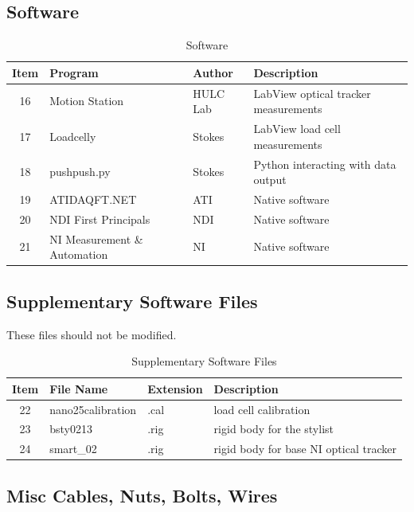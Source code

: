\documentclass[pdftex,11pt,letterpaper]{article}
\begin{document}
\subsection{Software}

\begin{table}[h!]
\begin{center}
    \begin{tabular}{ | c | l | l | l |}
    \hline
    Item & Program & Author & Description \\ \hline
    16 & Motion Station & HULC Lab & LabView optical tracker measurements \\ \hline
    17 & Loadcelly & Stokes & LabView load cell measurements \\ \hline
    18 & pushpush.py & Stokes & Python interacting with data output \\ \hline
    19 & ATIDAQFT.NET & ATI & Native software \\ \hline
    20 & NDI First Principals & NDI & Native software \\ \hline
    21 & NI Measurement \& Automation & NI & Native software \\ \hline
	\end{tabular}
	\caption{Software}
\end{center}
\end{table}

\subsection{Supplementary Software Files}
These files should not be modified. 
\begin{table}[h!]
\begin{center}
    \begin{tabular}{ | c | l | l | l |}
    \hline
    Item & File Name & Extension & Description \\ \hline
    22 & nano25calibration & .cal & load cell calibration \\ \hline
    23 & bsty0213 & .rig & rigid body for the stylist \\ \hline
    24 & smart\_02 & .rig & rigid body for base NI optical tracker \\ \hline
	\end{tabular}
	\caption{Supplementary Software Files}
\end{center}
\end{table}

\pagebreak
\subsection{Misc Cables, Nuts, Bolts, Wires}
\end{document}
